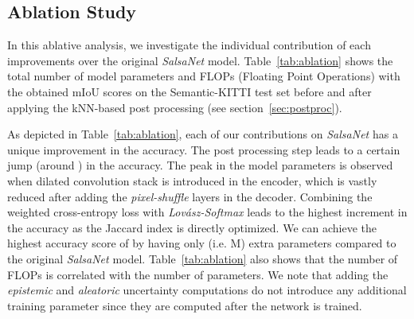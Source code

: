\documentclass[letterpaper, 10 pt, conference]{ieeeconf}
\makeatletter
\newcommand{\sn}[1]{\textit{SalsaNet }{#1}}
\newcommand{\ls}[1]{\textit{Lov\'{a}sz-Softmax }{#1}}
\newcommand{\sk}[1]{Semantic-KITTI {#1}}
\def\ie{i.e.\@\xspace}
\makeatother
\begin{document}
  
  
  
\subsection{Ablation Study}
\label{sec:ablation}

In this ablative analysis, we investigate the individual contribution of each  improvements over the original \sn model.
Table~\ref{tab:ablation}  shows the total number of model parameters and FLOPs (Floating Point Operations)   with the obtained mIoU scores on the \sk test set before and after applying the kNN-based post processing   (see section~\ref{sec:postproc}).
 
As depicted in Table~\ref{tab:ablation}, each of our contributions on \sn has a unique improvement in the accuracy. The post processing step leads to a certain jump (around ) in the accuracy. The peak in the model parameters is observed when dilated convolution stack is introduced in the encoder, which is vastly reduced after adding the \textit{pixel-shuffle} layers in the decoder. Combining the weighted cross-entropy loss with  \ls leads to the highest increment in the accuracy as the Jaccard index is directly optimized.
We can achieve the highest accuracy score of  by having only  (\ie M) extra parameters compared to the original \sn model. Table~\ref{tab:ablation} also shows that the number of FLOPs is  correlated with the number of parameters.
We note that adding  the \textit{epistemic}  and \textit{aleatoric} uncertainty computations do not introduce any additional training parameter  since they are computed after the network is trained.


  





     
\begin{table}[!t]\centering
{}
\caption{Runtime performance on the  Semantic-KITTI test set} 
\label{tab:runtime}
\end{table}
\end{document}
